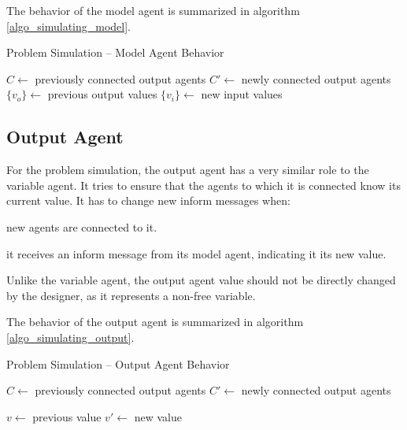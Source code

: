 The behavior of the model agent is summarized in algorithm \ref{algo_simulating_model}.

\begin{algorithm}
\caption{Problem Simulation -- Model Agent Behavior}
\label{algo_simulating_model}

	$C \leftarrow$ previously connected output agents\;
	$C'\leftarrow$ newly connected output agents\;
	$\{v_o\} \leftarrow$ previous output values\;
	$\{v_i\} \leftarrow$ new input values\;

	
	
\end{algorithm}

\subsection{Output Agent}

For the problem simulation, the output agent has a very similar role to the variable agent. It tries to ensure that the agents to which it is connected know its current value. It has to change new inform messages when:
\begin{compactitem}
\item new agents are connected to it.
\item it receives an inform message from its model agent, indicating it its new value.
\end{compactitem}

Unlike the variable agent, the output agent value should not be directly changed by the designer, as it represents a non-free variable.

The behavior of the output agent is summarized in algorithm \ref{algo_simulating_output}.

\begin{algorithm}
\caption{Problem Simulation -- Output Agent Behavior}
\label{algo_simulating_output}

	$C \leftarrow$ previously connected output agents\;
	$C'\leftarrow$ newly connected output agents\;
		
	$v \leftarrow$ previous value\;
	$v'\leftarrow$ new value\;
	
	
	
\end{algorithm}

